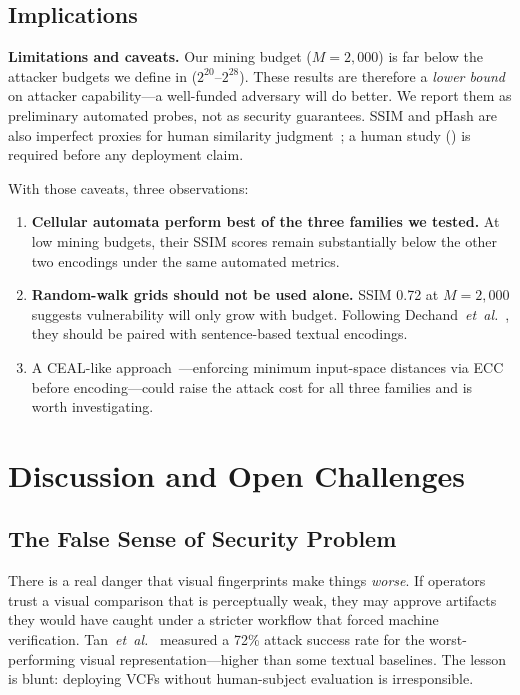 \documentclass[conference,10pt]{IEEEtran}
\newcommand{\etal}{\textit{et~al.}}
\begin{document}
\subsection{Implications}

\smallskip\noindent\textbf{Limitations and caveats.}
Our mining budget ($M{=}2{,}000$) is far below the attacker budgets we define in  ($2^{20}$--$2^{28}$).
These results are therefore a \emph{lower bound} on attacker capability---a well-funded adversary will do better.
We report them as preliminary automated probes, not as security guarantees.
SSIM and pHash are also imperfect proxies for human similarity judgment~\cite{berthier2024collision,zhang2025atkscopes}; a human study () is required before any deployment claim.

With those caveats, three observations:

\begin{enumerate}[leftmargin=*,nosep]
  \item \textbf{Cellular automata perform best of the three families we tested.} At low mining budgets, their SSIM scores remain substantially below the other two encodings under the same automated metrics.
  \item \textbf{Random-walk grids should not be used alone.} SSIM 0.72 at $M{=}2{,}000$ suggests vulnerability will only grow with budget. Following Dechand~\etal~\cite{dechand2016empirical}, they should be paired with sentence-based textual encodings.
  \item A CEAL-like approach~\cite{azimpourkivi2020human}---enforcing minimum input-space distances via ECC before encoding---could raise the attack cost for all three families and is worth investigating.
\end{enumerate}

\section{Discussion and Open Challenges}
\label{sec:discussion}

\subsection{The False Sense of Security Problem}

There is a real danger that visual fingerprints make things \emph{worse}.
If operators trust a visual comparison that is perceptually weak, they may approve artifacts they would have caught under a stricter workflow that forced machine verification.
Tan~\etal~\cite{tan2017unicorns} measured a 72\% attack success rate for the worst-performing visual representation---higher than some textual baselines.
The lesson is blunt: deploying VCFs without human-subject evaluation is irresponsible.
\end{document}
